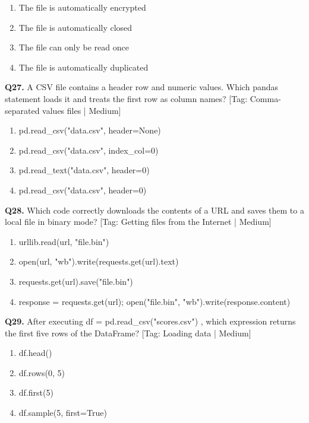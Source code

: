 \begin{enumerate}[label=(\alph*),topsep=2pt,itemsep=1pt,partopsep=0pt,parsep=0pt]
    \item {The file is automatically encrypted}
    \item {The file is automatically closed}
    \item {The file can only be read once}
    \item {The file is automatically duplicated}
\end{enumerate}
\vspace{2mm}
\noindent\textbf{Q27.} A CSV file contains a header row and numeric values. Which pandas statement loads it and treats the first row as column names? \hfill [Tag: Comma-separated values files | Medium]
\begin{enumerate}[label=(\alph*),topsep=2pt,itemsep=1pt,partopsep=0pt,parsep=0pt]
    \item {pd.read\_csv("data.csv", header=None)}
    \item {pd.read\_csv("data.csv", index\_col=0)}
    \item {pd.read\_text("data.csv", header=0)}
    \item {pd.read\_csv("data.csv", header=0)}
\end{enumerate}
\vspace{2mm}
\noindent\textbf{Q28.} Which code correctly downloads the contents of a URL and saves them to a local file in binary mode? \hfill [Tag: Getting files from the Internet | Medium]
\begin{enumerate}[label=(\alph*),topsep=2pt,itemsep=1pt,partopsep=0pt,parsep=0pt]
    \item {urllib.read(url, "file.bin")}
    \item {open(url, "wb").write(requests.get(url).text)}
    \item {requests.get(url).save("file.bin")}
    \item {response = requests.get(url); open("file.bin", "wb").write(response.content)}
\end{enumerate}
\vspace{2mm}
\noindent\textbf{Q29.} After executing df = pd.read\_csv("scores.csv") , which expression returns the first five rows of the DataFrame? \hfill [Tag: Loading data | Medium]
\begin{enumerate}[label=(\alph*),topsep=2pt,itemsep=1pt,partopsep=0pt,parsep=0pt]
    \item {df.head()}
    \item {df.rows(0, 5)}
    \item {df.first(5)}
    \item {df.sample(5, first=True)}
\end{enumerate}
